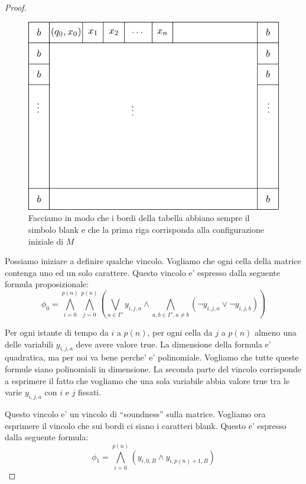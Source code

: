 \begin{proof}
    \begin{figure}[h]
        \begin{center}
            \includegraphics{./img/NPClass/SATproof2.pdf}
            \caption{Facciamo in modo che i bordi della tabella abbiano sempre il simbolo blank e
            che la prima riga corrisponda alla configurazione iniziale di $M$}
        \end{center}
    \end{figure}


    Possiamo iniziare a definire qualche vincolo. Vogliamo che ogni cella della matrice contenga uno ed
    un solo carattere. Questo vincolo e' espresso dalla seguente formula proposizionale:
    \begin{equation*}
        \phi_{0} = \bigwedge_{i=0}^{p(n)}\bigwedge_{j=0}^{p(n)}\left(\bigvee_{a \in \Gamma'}
            y_{i,j,a}
        \land \bigwedge_{a,b \in \Gamma',a \not= b}(\lnot y_{i,j,a} \lor \lnot y_{i,j,b})\right)
    \end{equation*}
    
    Per ogni istante di tempo da $i$ a $p(n)$, per ogni cella da $j$ a $p(n)$ almeno una delle
    variabili $y_{i,j,a}$ deve avere valore true. La dimensione della formula e' quadratica, ma per
    noi va bene perche' e' polinomiale. Vogliamo che tutte queste formule siano polinomiali in
    dimensione. La seconda parte del vincolo corrisponde a esprimere il fatto che vogliamo che una
    sola variabile abbia valore true tra le varie $y_{i,j,a}$ con $i$ e $j$ fissati.

    Questo vincolo e' un vincolo di ``soundness'' sulla matrice. Vogliamo ora esprimere il vincolo che
    sui bordi ci siano i caratteri blank. Questo e' espresso dalla seguente formula:
    \begin{equation*}
        \phi_{1} = \bigwedge_{i=0}^{p(n)}(y_{i,0,B} \land y_{i,p(n)+1,B})
    \end{equation*}


\end{proof}
